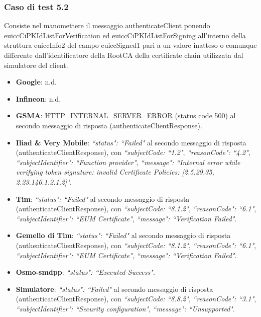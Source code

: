 \documentclass[10pt, oneside]{book}
\begin{document}
\subsubsection{Caso di test 5.2}
Consiste nel manomettere il messaggio authenticateClient ponendo euiccCiPKIdListForVerification ed euiccCiPKIdListForSigning all'interno della struttura euiccInfo2 del campo euiccSigned1 pari a un valore inatteso o comunque differente dall'identificatore della RootCA della certificate chain utilizzata dal simulatore del client.
\begin{itemize}
\item \textbf{Google}: n.d.
\item \textbf{Infineon}: n.d.
\item \textbf{GSMA}: HTTP\_INTERNAL\_SERVER\_ERROR (status code 500) al secondo messaggio di risposta (authenticateClientResponse).
\item \textbf{Iliad \& Very Mobile}: \textit{``status": ``Failed"} al secondo messaggio di risposta (authenticateClientResponse), con \textit{``subjectCode: ``1.2"}, \textit{``reasonCode": ``4.2"}, \textit{``subjectIdentifier": ``Function provider"}, \textit{``message": ``Internal error while verifying token signature: invalid Certificate Policies: [2.5.29.35, 2.23.146.1.2.1.2]"}.
\item \textbf{Tim}: \textit{``status": ``Failed"} al secondo messaggio di risposta (authenticateClientResponse), con \textit{``subjectCode: ``8.1.2"}, \textit{``reasonCode": ``6.1"}, \textit{``subjectIdentifier": ``EUM Certificate"}, \textit{``message": ``Verification Failed"}.
\item \textbf{Gemello di Tim}: \textit{``status": ``Failed"} al secondo messaggio di risposta (authenticateClientResponse), con \textit{``subjectCode: ``8.1.2"}, \textit{``reasonCode": ``6.1"}, \textit{``subjectIdentifier": ``EUM Certificate"}, \textit{``message": ``Verification Failed"}.
\item \textbf{Osmo-smdpp}: \textit{``status": ``Executed-Success"}.
\item \textbf{Simulatore}: \textit{``status": ``Failed"} al secondo messaggio di risposta (authenticateClientResponse), con \textit{``subjectCode: ``8.8.2"}, \textit{``reasonCode": ``3.1"}, \textit{``subjectIdentifier": ``Security configuration"}, \textit{``message": ``Unsupported"}.
\end{itemize}
\end{document}
